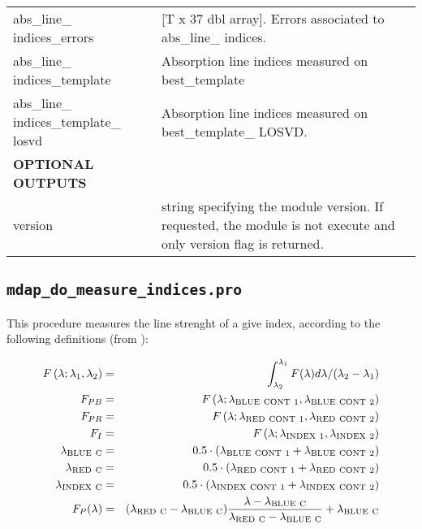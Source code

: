 \documentclass[11pt]{book}
\begin{document}
\begin{center}
\begin{longtable}{p{2.7cm}| p{11.1cm}}
%
abs\_line\_ indices\_errors & [T x 37 dbl array]. Errors associated to abs\_line\_ indices. \\
%
abs\_line\_ indices\_template &  Absorption line indices measured on best\_template \\
%
abs\_line\_ indices\_template\_ losvd &   Absorption line indices measured on best\_template\_ LOSVD.\\
\hline
{\bf  OPTIONAL OUTPUTS} &  \\
version & string specifying the module version. If requested, the module is not execute and only version flag is returned.\\
\hline
\end{longtable}
\end{center}





\subsection{{\tt mdap\_do\_measure\_indices.pro}}
\label{dap_sec:mdap_do_measure_indices}

This procedure measures the line strenght of a give index, according to the following definitions (from \citealt{Worthey+94}): 


\begin{eqnarray}
F\left(\lambda; \lambda_1, \lambda_2 \right) &=& \int_{\lambda_2}^{\lambda_1} F(\lambda)d\lambda/(\lambda_2 - \lambda_1) \nonumber \\
F_{PB} &=& F\left(\lambda; \lambda_{\rm BLUE\ CONT\ 1}, \lambda_{\rm BLUE\ CONT\ 2} \right) \nonumber \\
F_{PR} &=& F\left(\lambda; \lambda_{\rm RED\ CONT\ 1}, \lambda_{\rm RED\ CONT\ 2} \right) \nonumber  \\
F_{I} &=& F\left(\lambda; \lambda_{\rm INDEX\ 1}, \lambda_{\rm INDEX\ 2} \right) \nonumber  \nonumber  \\
\lambda_{\rm BLUE\ C} &=& 0.5 \cdot (\lambda_{\rm BLUE\ CONT\ 1} + \lambda_{\rm BLUE\ CONT\ 2}) \nonumber  \\
\lambda_{\rm RED\ C} &=& 0.5 \cdot (\lambda_{\rm RED\ CONT\ 1} + \lambda_{\rm RED\ CONT\ 2}) \nonumber  \\
\lambda_{\rm INDEX\ C} &=& 0.5 \cdot (\lambda_{\rm INDEX\ CONT\ 1} + \lambda_{\rm INDEX\ CONT\ 2}) \nonumber  \\
F_P(\lambda) &=& (\lambda_{\rm RED\ C} -\lambda_{\rm BLUE\ C} )\frac{\lambda-\lambda_{\rm BLUE\ C}}{\lambda_{\rm RED\ C} -\lambda_{\rm BLUE\ C}}+\lambda_{\rm BLUE\ C}
\end{eqnarray}
\end{document}
